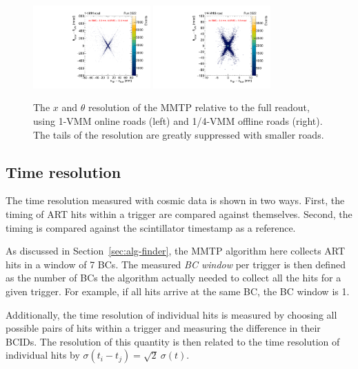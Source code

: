 \begin{figure}[!htpb]
  \begin{center}
    \includegraphics[width=0.4\textwidth]{figures/gbtanalysis3522/TP_xres_angres_full.pdf}
    \includegraphics[width=0.4\textwidth]{figures/gbtanalysis3522/TP_xres_angres.pdf}
  \end{center}
  \vspace{-10pt}
  \caption{The $x$ and $\theta$ resolution of the MMTP relative to the full readout, using 1-VMM online roads (left) and 1/4-VMM offline roads (right). The tails of the resolution are greatly suppressed with smaller roads.}
  \label{fig:xthetares}
\end{figure}

\subsection{Time resolution}

The time resolution measured with cosmic data is shown in two ways. First, the timing of ART hits within a trigger are compared against themselves. Second, the timing is compared against the scintillator timestamp as a reference.

As discussed in Section~\ref{sec:alg-finder}, the MMTP algorithm here collects ART hits in a window of 7 BCs. The measured \textit{BC window} per trigger is then defined as the number of BCs the algorithm actually needed to collect all the hits for a given trigger. For example, if all hits arrive at the same BC, the BC window is 1.

Additionally, the time resolution of individual hits is measured by choosing all possible pairs of hits within a trigger and measuring the difference in their BCIDs. The resolution of this quantity is then related to the time resolution of individual hits by $\sigma(t_i - t_j) = \sqrt{2}\ \sigma(t)$.

